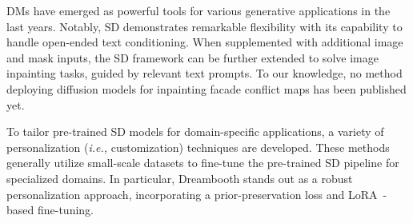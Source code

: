 
\gls{DM}s have emerged as powerful tools for various generative applications in the last years. 
Notably, \gls{SD} \cite{Rombach_2022_CVPR} demonstrates remarkable flexibility with its capability to handle open-ended text conditioning. When supplemented with additional image and mask inputs, the \gls{SD} framework can be further extended to solve image inpainting tasks, guided by relevant text prompts. 
To our knowledge, no method deploying diffusion models for inpainting facade conflict maps has been published yet.

To tailor pre-trained \gls{SD} models for domain-specific applications, a variety of personalization ({\em i.e.,} customization) techniques \cite{gal2022textual,kumari2022customdiffusion,Wei_2023_ICCV} are developed. These methods generally utilize small-scale datasets to fine-tune the pre-trained \gls{SD} pipeline for specialized domains. In particular, Dreambooth \cite{Ruiz2023} stands out as a robust personalization approach, incorporating a prior-preservation loss and LoRA~\cite{hu2022lora}-based fine-tuning. 

